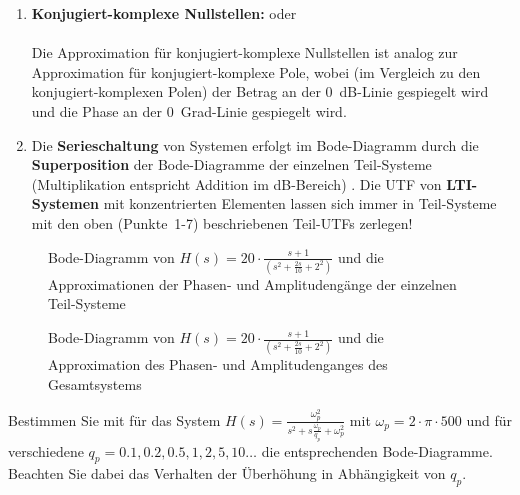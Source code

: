 {\begin{enumerate}
      \item{} {\bf Konjugiert-komplexe Nullstellen:}
 oder\\  \\
        Die Approximation f\"ur konjugiert-komplexe Nullstellen ist
        analog zur Approximation f\"ur konjugiert-komplexe Pole,
        wobei (im Vergleich zu den konjugiert-komplexen Polen) der Betrag an der 0~dB-Linie gespiegelt wird und die
        Phase an der 0~Grad-Linie gespiegelt wird.
\item{} Die {\bf Serieschaltung} von Systemen
  erfolgt im Bode-Diagramm durch die {\bf
    Superposition} der Bode-Diagramme der
  einzelnen Teil-Systeme (Multiplikation entspricht Addition im dB-Bereich)
  \cite{FRE:BOS:04, MOS:89}. Die UTF von {\bf LTI-Systemen} mit konzentrierten Elementen lassen sich immer in Teil-Systeme mit den oben (Punkte~1-7) beschriebenen Teil-UTFs zerlegen!
\end{enumerate}
\vspace*{-3mm}
\begin{figure}[!htb]%
\vspace*{-7mm}
\begin{center}
  \vspace*{-8mm}\caption{Bode-Diagramm von $H(s)=20\cdot \frac{s+1}{(s^2+\frac{2s}{10}+2^2)}$ und die Approximationen der Phasen- und Amplitudeng\"ange der einzelnen Teil-Systeme}
\end{center}
\vspace*{-6mm}
\end{figure}
\newpage
\begin{figure}[!htb]%
\vspace*{-5mm}
\begin{center}
  \vspace*{-8mm}\caption{Bode-Diagramm von $H(s)=20\cdot \frac{s+1}{(s^2+\frac{2s}{10}+2^2)}$ und die Approximation des Phasen- und Amplitudenganges des Gesamtsystems}
\end{center}
\vspace*{-6mm}
\end{figure}
\aufg Bestimmen Sie mit  f\"ur das System
$H(s)=\frac{\omega_p^2}{s^2+s\frac{\omega_p}{q_p}+\omega_p^2}$ mit
$\omega_p=2\cdot\pi\cdot 500$ und f\"ur verschiedene $q_p=0.1, 0.2, 0.5,
1, 2, 5, 10 \ldots$ die entsprechenden Bode-Diagramme. Beachten Sie
dabei das Verhalten der \"Uberh\"ohung in Abh\"angigkeit von $q_p$.

}
